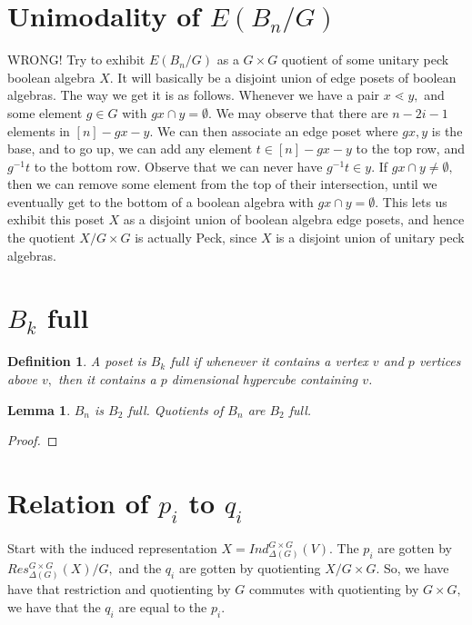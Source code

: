 \documentclass{amsart}
\newtheorem{lem}[subsubsection]{Lemma}
\newtheorem{defn}[subsubsection]{Definition}
\begin{document}
\section{Unimodality of $E(B_n/G)$}
WRONG!
Try to exhibit $E(B_n/G)$ as a $G\times G$ quotient of some unitary peck boolean algebra $X.$ It will basically be a disjoint union of edge posets of boolean algebras. The way we get it is as follows. Whenever we have a pair $x \lessdot y,$ and some element $g \in G$ with $gx \cap y = \emptyset.$ We may observe that there are $n-2i-1$ elements in $[n]-gx-y.$ We can then associate an edge poset where $gx,y$ is the base, and to go up, we can add any element $t \in [n]-gx-y$ to the top row, and $g^{-1}t$ to the bottom row. Observe that we can never have $g^{-1}t \in y.$ If $gx \cap y \neq \emptyset,$ then we can remove some element from the top of their intersection, until we eventually get to the bottom of a boolean algebra with $gx \cap y = \emptyset.$ This lets us exhibit this poset $X$ as a disjoint union of boolean algebra edge posets, and hence the quotient $X/G\times G$ is actually Peck, since $X$ is a disjoint union of unitary peck algebras.

\section{$B_k$ full}


\begin{defn}
A poset is $B_k$ full if whenever it contains a vertex $v$ and $p$ vertices above $v,$ then it contains a $p$ dimensional hypercube containing $v$.
\end{defn}

\begin{lem}
$B_n$ is $B_2$ full. Quotients of $B_n$ are $B_2$ full.
\end{lem}
\begin{proof}

\end{proof}

\section{Relation of $p_i$ to $q_i$}

Start with the induced representation $X = Ind_{\Delta (G)}^{G \times G}(V)$. 
The $p_i$ are gotten by $Res^{G \times G}_{\Delta(G)}(X)/G,$ 
and the $q_i$ are gotten by quotienting $X/G\times G.$ So, we have have that restriction and quotienting by $G$ commutes with quotienting by $G \times G,$ we have that the $q_i$ are equal to the $p_i.$
\end{document}
